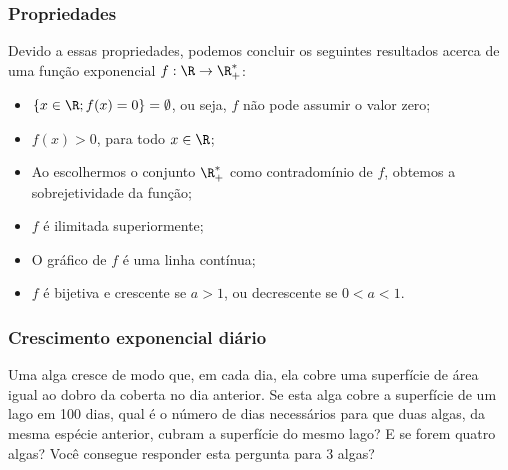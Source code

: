 \begin{frame}
\frametitle{Propriedades} 

Devido a essas propriedades, podemos concluir os seguintes
resultados acerca de uma função exponencial $f: \R \to \R_+^\ast$:
\begin{itemize}
	\item $\{x \in \R ; f(x) = 0\} = \emptyset$, ou seja, $f$ não pode assumir o valor
	zero;
	\item $f(x)>0$, para todo $x \in \R$;
	\item Ao escolhermos o conjunto $\R_+^\ast$ como contradomínio de $f$, obtemos
	a sobrejetividade da função;
	\item $f$ é ilimitada superiormente;
	\item O gráfico de $f$ é uma linha contínua;
	\item $f$ é bijetiva e crescente se $a>1$, ou decrescente se
	$0<a<1$.
\end{itemize}
\end{frame}


\begin{frame}
	\frametitle{Crescimento exponencial diário}

\begin{exemplo}\label{exem-alga}
	Uma alga cresce de modo que, em cada dia, ela cobre uma superfície de área igual ao dobro da coberta no dia anterior. Se esta alga cobre a superfície de um lago em 100 dias, qual é o número de dias necessários para que duas algas, da mesma espécie anterior, cubram a superfície do mesmo lago? E se forem quatro algas? Você consegue responder esta pergunta para 3 algas?
	\end{exemplo}

\end{frame}

